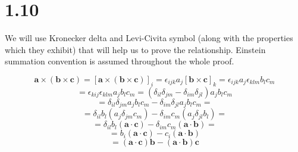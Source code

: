 \documentclass{article}
\begin{document}
\section*{1.10}

We will use Kronecker delta and Levi-Civita symbol (along with the properties which they exhibit)
that will help us to prove the relationship. Einstein
summation convention is assumed throughout the whole proof.


\begin{equation*}
    \mathbf{a} \times (\mathbf{b} \times \mathbf{c}) = [\mathbf{a} \times (\mathbf{b} \times \mathbf{c})]_{i} = \epsilon_{ijk}a_{j}[\mathbf{b} \times \mathbf{c}]_{k} = \epsilon_{ijk}a_{j}\epsilon_{klm}b_{l}c_{m}
\end{equation*}
\begin{equation*}
    = \epsilon_{kij}\epsilon_{klm}a_{j}b_{l}c_{m} = (\delta_{il}\delta_{jm} - \delta_{im}\delta_{jl})a_{j}b_{l}c_{m}
\end{equation*}
\begin{equation*}
    = \delta_{il}\delta_{jm}a_{j}b_{l}c_{m} - \delta_{im}\delta_{jl}a_{j}b_{l}c_{m} = 
\end{equation*}
\begin{equation*}
    = \delta_{il}b_{l}(a_{j}\delta_{jm}c_{m}) - \delta_{im}c_{m}(a_{j}\delta_{jl}b_{l}) =
\end{equation*}
\begin{equation*}
    = \delta_{il}b_{l}(\mathbf{a} \cdot \mathbf{c}) - \delta_{im}c_{m}(\mathbf{a} \cdot \mathbf{b}) = 
\end{equation*}
\begin{equation*}
    = b_{i}(\mathbf{a} \cdot \mathbf{c}) - c_{i}(\mathbf{a} \cdot \mathbf{b})
\end{equation*}
\begin{equation*}
    = (\mathbf{a} \cdot \mathbf{c})\mathbf{b} - (\mathbf{a} \cdot \mathbf{b})\mathbf{c}
\end{equation*}
\end{document}

